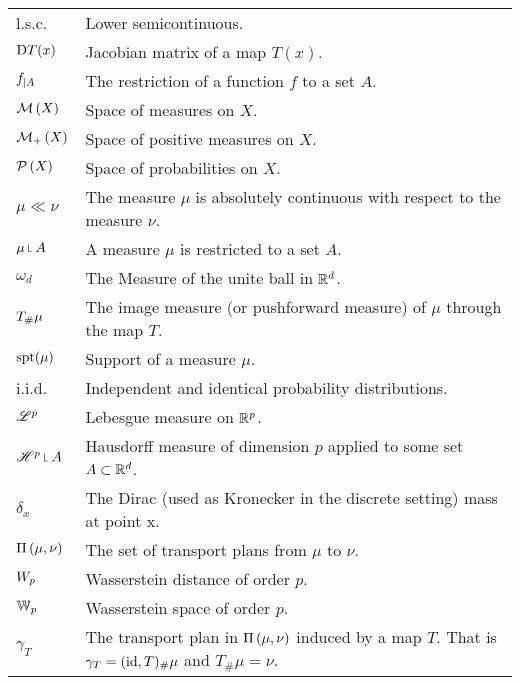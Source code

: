 \begin{tabular}{ l l }
	l.s.c. & Lower semicontinuous. \\
	$\D T(x)$ & Jacobian matrix of a map $T(x)$. \\
	$\domainrestr{A}{f}$ & The restriction of a function $f$ to a set $A$. \\
	$\MeasureSp\parentheses{X}$ & Space of measures on $X$. \\
	$\PMeasureSp\parentheses{X}$ & Space of positive measures on $X$. \\
	$\PlanSp\parentheses{X}$ & Space of probabilities on $X$. \\	
	$\mu \ll\nu$ & The measure $\mu$ is absolutely continuous with respect to the measure $\nu$. \\
	$\mu \measurerestr A$ & A measure $\mu$ is restricted to a set $A$.\\
	$\omega_d$ & The Measure of the unite ball in $\Real^d$. \\
	$\Tmeasure{\mu}{T}$ &  The image measure (or pushforward measure) of $\mu$ through the map $T$.\\
	$\spt(\mu)$& Support of a measure $\mu$.\\
	i.i.d. & Independent and identical probability distributions.\\
	$\Lebesgue^p$ & Lebesgue measure on $\Real^p$.\\
	$\Hausdorff^p\measurerestr A$ & Hausdorff measure of dimension $p$ applied to some set $A \subset \Real^d$. \\
	$\delta_x$ & The Dirac (used as Kronecker in the discrete setting) mass at point x. \\
	$\TransPlansSet{\mu}{\nu}$ & The set of transport plans from $\mu$ to $\nu$.\\
	$\WassersteinDist{p}$ & Wasserstein distance of order $p$. \\	
	$\WassersteinSp{p}$ & Wasserstein space of order $p$.\\
 	$\gamma_T$ & The transport plan in $\TransPlansSet{\mu}{\nu}$ induced by a map $T$. That is $\gamma_T = (\id, T)_\#\mu$ and $T_\#\mu=\nu$. \\

\end{tabular}
